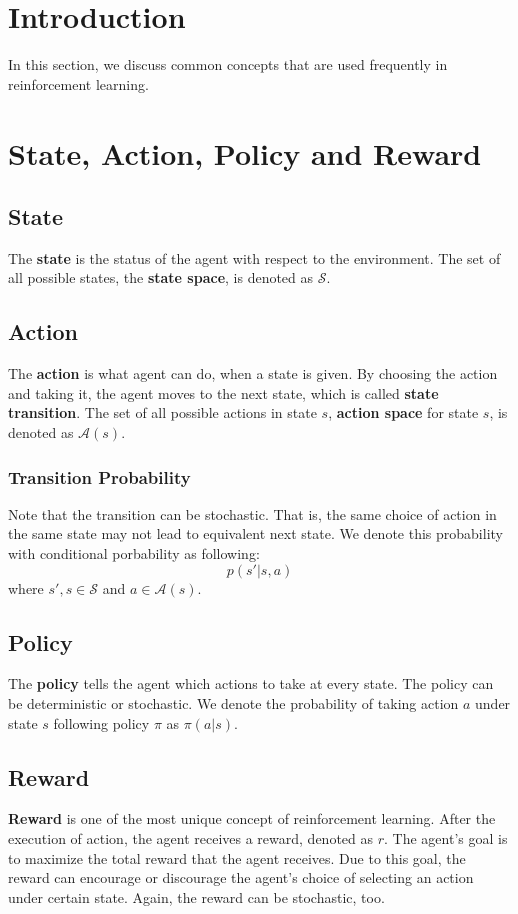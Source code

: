 \section{Introduction}
In this section, we discuss common concepts that are used frequently in reinforcement learning.

\section{State, Action, Policy and Reward}
\subsection{State}
    The \textbf{state} is the status of the agent with respect to the environment.
    The set of all possible states, the \textbf{state space}, is denoted as $\mathcal{S}$.
\subsection{Action}
    The \textbf{action} is what agent can do, when a state is given. By choosing the action and
    taking it, the agent moves to the next state, which is called \textbf{state transition}. The set of all possible actions in state $s$,
    \textbf{action space} for state $s$, is denoted as $\mathcal{A}(s)$.
    \subsubsection{Transition Probability}
        Note that the transition can be stochastic. That is, the same choice of action in the same state
        may not lead to equivalent next state. We denote this probability with conditional porbability as following:
        \begin{equation}
            p(s'|s,a)
        \end{equation}
        where $s',s \in \mathcal{S}$ and $a \in \mathcal{A}(s)$.
\subsection{Policy}
    The \textbf{policy} tells the agent which actions to take at every state. The policy can be deterministic or stochastic.
    We denote the probability of taking action $a$ under state $s$ following policy $\pi$ as $\pi(a|s)$.
    
\subsection{Reward}
    \textbf{Reward} is one of the most unique concept of reinforcement learning. After the execution of action, the agent
    receives a reward, denoted as $r$. The agent's goal is to maximize the total reward that the agent receives.
    Due to this goal, the reward can encourage or discourage the agent's
    choice of selecting an action under certain state. Again, the reward can be stochastic, too.

